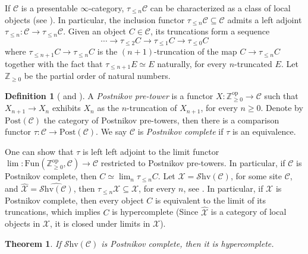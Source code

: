 \documentclass[10pt]{amsart}
\newcommand{\C}{\mathscr{C}}
\newcommand{\X}{\mathscr{X}}
\newcommand{\bZ}{\mathbb{Z}}
\newcommand{\Fun}{\mathrm{Fun}}
\newcommand{\Shv}{\mathscr{S}\mathrm{hv}}
\newcommand{\pos}{\mathrm{Post}}
\newcommand{\op}{\mathrm{op}}
\newtheorem{theorem}[equation]{Theorem}
\theoremstyle{definition}
\newtheorem{definition}[equation]{Definition}
\theoremstyle{remark}
\numberwithin{equation}{section}
\begin{document}
If $\C$ is a presentable $\infty$-category, $\tau_{\leq n}\C$ can be characterized as a class of local objects (see \cite[Proposition 5.5.6.18]{lurie2009htt}). In particular, the inclusion functor $\tau_{\leq n}\C\subseteq\C$ admits a left adjoint $\tau_{\leq n}:\C\to\tau_{\leq n}\C$. Given an object $C\in\C$, its truncations form a sequence 
\begin{equation}
	\cdots\to\tau_{\leq2}C\to\tau_{\leq1}C\to\tau_{\leq0}C
\end{equation}
where $\tau_{\leq n+1}C\to\tau_{\leq n}C$ is the $(n+1)$-truncation of the map $C\to\tau_{\leq n}C$ together with the fact that $\tau_{\leq n+1}E\simeq E$ naturally, for every $n$-truncated $E$. Let $\bZ_{\geq0}$ be the partial order of natural numbers. 
\begin{definition}[{\cite[Definition A.7.2.1]{lurie2018sag} and \cite[Definition 5.5.6.23]{lurie2009htt}}]
	A \emph{Postnikov pre-tower} is a functor $X:\bZ_{\geq0}^{\op}\to\C$ such that $X_{n+1}\to X_n$ exhibits $X_n$ as the $n$-truncation of $X_{n+1}$, for every $n\geq0$. Denote by $\pos(\C)$ the category of Postnikov pre-towers, then there is a comparison functor $\tau:\C\to\pos(\C)$. We say $\C$ is \emph{Postnikov complete} if $\tau$ is an equivalence. 
\end{definition}One can show that $\tau$ is left left adjoint to the limit functor $\lim:\Fun(\bZ_{\geq0}^\mathrm{op},\C)\to\C$ restricted to Postnikov pre-towers. In particular, if $\C$ is Postnikov complete, then $C\simeq\lim_n\tau_{\leq n}C$. Let $\X=\Shv(\C)$, for some site $\C$, and $\widehat{\X}=\widehat{\Shv(\C)}$, then $\tau_{\leq n}\X\subseteq\widehat{\X}$, for every $n$, see \cite[Lemma 6.5.2.9]{lurie2009htt}. In particular, if $\X$ is Postnikov complete, then every object $C$ is equivalent to the limit of its truncations, which implies $C$ is hypercomplete (Since $\widehat{\X}$ is a category of local objects in $\X$, it is closed under limits in $\X$).
\begin{theorem}
	If $\Shv(\C)$ is Postnikov complete, then it is hypercomplete. 
\end{theorem} 


{\footnotesize


}
\end{document}
